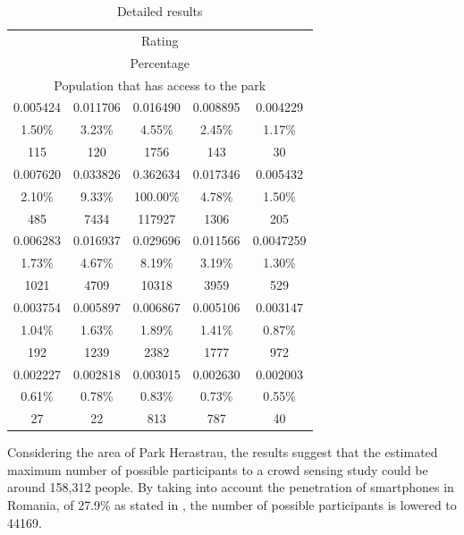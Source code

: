 \begin{center}
\begin{table}[htb]
  \caption{Detailed results}
  \begin{tabular}{|c|c|c|c|c|}
	\hline
		
\multicolumn{5}{|c|}{Rating} \\
\multicolumn{5}{|c|}{Percentage} \\
\multicolumn{5}{|c|}{Population that has access to the park} \\
	
	\hline
	\hline

   	0.005424 	& 	0.011706	& 	0.016490	&	0.008895	& 	0.004229 \\
	1.50\%		&	3.23\%		&	4.55\%		&	2.45\%		&	1.17\% \\
	115		&	120		&	1756		&	143		&	30 \\
	\hline
   	0.007620 	& 	0.033826	& 	0.362634	&	0.017346	& 	0.005432 \\
	2.10\%		&	9.33\%		&	100.00\%	&	4.78\%		&	1.50\% \\
	485		&	7434		&	117927		&	1306		&	205 \\
	\hline
   	0.006283 	& 	0.016937	& 	0.029696	&	0.011566	& 	0.0047259 \\
	1.73\%		&	4.67\%		&	8.19\%		&	3.19\%		&	1.30\% \\
	1021		&	4709		&	10318		&	3959		&	529 \\
	\hline
   	0.003754 	& 	0.005897	& 	0.006867	&	0.005106	& 	0.003147 \\
	1.04\%		&	1.63\%		&	1.89\%		&	1.41\%		&	0.87\% \\
	192		&	1239		&	2382		&	1777		&	972 \\
	\hline
   	0.002227 	& 	0.002818	& 	0.003015	&	0.002630	& 	0.002003 \\
	0.61\%		&	0.78\%		&	0.83\%		&	0.73\%		&	0.55\% \\
	27		&	22		&	813		&	787		&	40 \\
	\hline
  \end{tabular}
  \label{table:reports}
\end{table}
\end{center}

Considering the area of Park Herastrau, the results suggest that the estimated maximum number of possible participants to a crowd sensing study could be around 158,312 people. By taking into account the penetration of smartphones in Romania, of 27.9\% as stated in \cite{poushter2016smartphone}, the number of possible participants is lowered to 44169.

